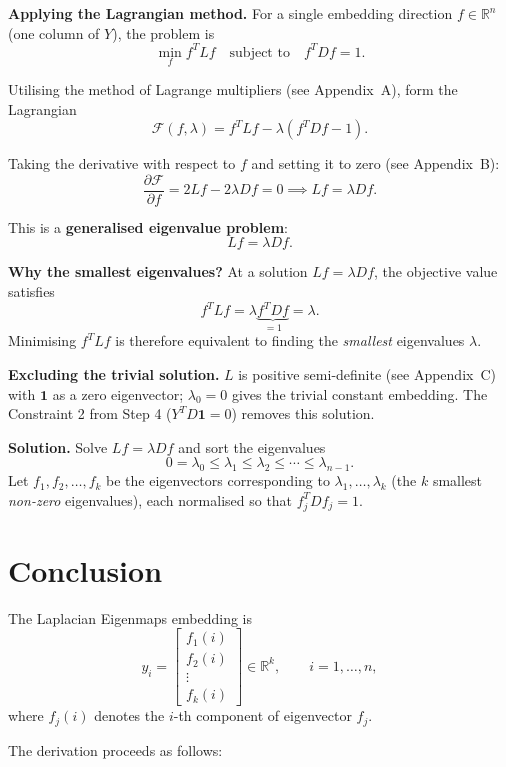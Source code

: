 \documentclass[11pt]{article}
\begin{document}
\textbf{Applying the Lagrangian method.}
For a single embedding direction $f \in \mathbb{R}^n$ (one column of $Y$),
the problem is
\[
  \min_f f^T L f \quad \text{subject to} \quad f^T D f = 1.
\]

Utilising the method of Lagrange multipliers (see Appendix~A), form the Lagrangian
\[
  \mathcal{F}(f, \lambda) = f^T L f - \lambda (f^T D f - 1).
\]

Taking the derivative with respect to $f$ and setting it to zero (see Appendix~B):
\[
  \frac{\partial \mathcal{F}}{\partial f} = 2Lf - 2\lambda D f = 0
  \implies L f = \lambda D f.
\]

This is a \textbf{generalised eigenvalue problem}:
\[
  Lf = \lambda D f.
\]

\textbf{Why the smallest eigenvalues?}  At a solution $Lf = \lambda Df$,
the objective value satisfies
\[
  f^T L f = \lambda \underbrace{f^T D f}_{=1} = \lambda.
\]
Minimising $f^T L f$ is therefore equivalent to finding the
\emph{smallest} eigenvalues $\lambda$.

\textbf{Excluding the trivial solution.}
$L$ is positive semi-definite (see Appendix~C) with $\mathbf{1}$ as a
zero eigenvector; $\lambda_0 = 0$ gives the trivial constant embedding.
The Constraint 2 from Step 4 ($Y^T D \mathbf{1} = 0$) removes this
solution.

\textbf{Solution.}
Solve $Lf = \lambda Df$ and sort the eigenvalues
\[
  0 = \lambda_0 \le \lambda_1 \le \lambda_2 \le \cdots \le \lambda_{n-1}.
\]
Let $f_1, f_2, \dots, f_k$ be the eigenvectors corresponding to
$\lambda_1, \dots, \lambda_k$ (the $k$ smallest \emph{non-zero}
eigenvalues), each normalised so that $f_j^T D f_j = 1$.

\section*{Conclusion}

The Laplacian Eigenmaps embedding is
\[
  y_i = \begin{bmatrix} f_1(i) \\ f_2(i) \\ \vdots \\ f_k(i) \end{bmatrix}
  \in \mathbb{R}^k, \qquad i = 1, \dots, n,
\]
where $f_j(i)$ denotes the $i$-th component of eigenvector $f_j$.

The derivation proceeds as follows:
\end{document}

